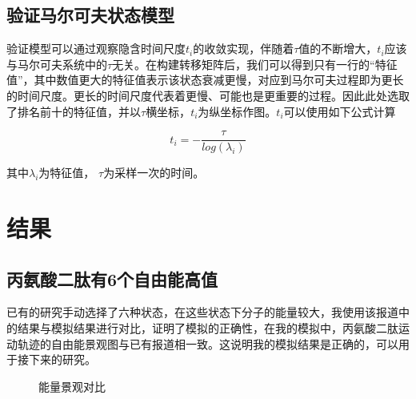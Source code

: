 \documentclass[a4paper]{article}
\begin{document}
\begin{CJK}{UTF8}{gbsn}
	\subsection{验证马尔可夫状态模型}

验证模型可以通过观察隐含时间尺度$t_{i}$的收敛实现，伴随着$\tau$值的不断增大，$t_{i}$应该与马尔可夫系统中的$\tau$无关。在构建转移矩阵后，我们可以得到只有一行的“特征值”，其中数值更大的特征值表示该状态衰减更慢，对应到马尔可夫过程即为更长的时间尺度。更长的时间尺度代表着更慢、可能也是更重要的过程。因此此处选取了排名前十的特征值，并以$\tau$横坐标，$t_{i}$为纵坐标作图。$t_{i}$可以使用如下公式计算


\begin{equation}
t_{i} = -\frac{\tau}{log(\lambda_{i})}
\end{equation}

其中$\lambda_{i}$为特征值， $\tau$为采样一次的时间。





\section{结果}
	\subsection{丙氨酸二肽有6个自由能高值}
		已有的研究手动选择了六种状态，在这些状态下分子的能量较大，我使用该报道中的结果与模拟结果进行对比，证明了模拟的正确性，在我的模拟中，丙氨酸二肽运动轨迹的自由能景观图与已有报道相一致。这说明我的模拟结果是正确的，可以用于接下来的研究。

\begin{figure}[H]
\centering  
{}
\caption{能量景观对比}
\label{Fig.main}
\end{figure}





\end{CJK}
\end{document}
